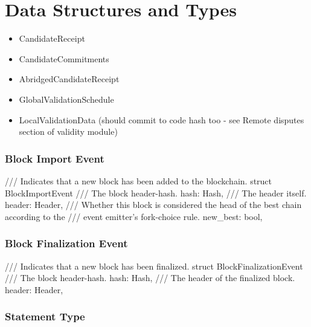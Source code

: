 \newline
{}

\section{Data Structures and Types}


\begin{itemize}
    \item CandidateReceipt
    \item CandidateCommitments
    \item AbridgedCandidateReceipt
    \item GlobalValidationSchedule
    \item LocalValidationData (should commit to code hash too - see Remote
    disputes section of validity module)
\end{itemize}

\subsubsection{Block Import Event}

\begin{verbnobox}[\small]
/// Indicates that a new block has been added to the blockchain.
struct BlockImportEvent {
  /// The block header-hash.
  hash: Hash,
  /// The header itself.
  header: Header,
  /// Whether this block is considered the head of the best chain according to the
  /// event emitter's fork-choice rule.
  new_best: bool,
}
\end{verbnobox}

\subsubsection{Block Finalization Event}

\begin{verbnobox}[\small]
/// Indicates that a new block has been finalized.
struct BlockFinalizationEvent {
  /// The block header-hash.
  hash: Hash,
  /// The header of the finalized block.
  header: Header,
}
\end{verbnobox}

\subsubsection{Statement Type}


